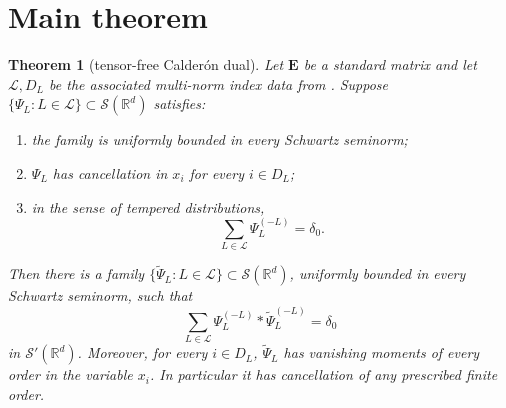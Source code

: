 \documentclass[11pt]{article}
\newtheorem{theorem}{Theorem}
\newcommand{\R}{\mathbb R}
\newcommand{\cL}{\mathcal L}
\newcommand{\cS}{\mathcal S}
\begin{document}
\section*{Main theorem}

\begin{theorem}[tensor-free Calder\'on dual]\label{thm:main}
Let $\mathbf E$ be a standard matrix and let $\cL,D_L$ be the associated
multi-norm index data from \cite{HNR}.  Suppose
$\{\Psi_L:L\in\cL\}\subset\cS(\R^d)$ satisfies:
\begin{enumerate}
\item the family is uniformly bounded in every Schwartz seminorm;
\item $\Psi_L$ has cancellation in $x_i$ for every $i\in D_L$;
\item in the sense of tempered distributions,
\[
  \sum_{L\in\cL}\Psi_L^{(-L)}=\delta_0.
\]
\end{enumerate}
Then there is a family
$\{\widetilde\Psi_L:L\in\cL\}\subset\cS(\R^d)$, uniformly bounded in every
Schwartz seminorm, such that
\begin{equation}\label{eq:calderon}
  \sum_{L\in\cL}
  \Psi_L^{(-L)}*\widetilde\Psi_L^{(-L)}=\delta_0
\end{equation}
in $\cS'(\R^d)$.  Moreover, for every $i\in D_L$,
$\widetilde\Psi_L$ has vanishing moments of every order in the variable
$x_i$.  In particular it has cancellation of any prescribed finite order.
\end{theorem}
\end{document}
